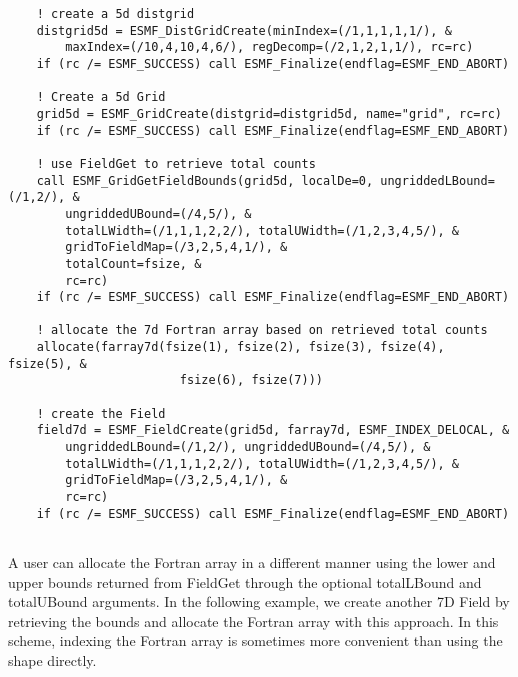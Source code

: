  \begin{verbatim}
    ! create a 5d distgrid
    distgrid5d = ESMF_DistGridCreate(minIndex=(/1,1,1,1,1/), &
        maxIndex=(/10,4,10,4,6/), regDecomp=(/2,1,2,1,1/), rc=rc)
    if (rc /= ESMF_SUCCESS) call ESMF_Finalize(endflag=ESMF_END_ABORT)

    ! Create a 5d Grid
    grid5d = ESMF_GridCreate(distgrid=distgrid5d, name="grid", rc=rc)
    if (rc /= ESMF_SUCCESS) call ESMF_Finalize(endflag=ESMF_END_ABORT)

    ! use FieldGet to retrieve total counts
    call ESMF_GridGetFieldBounds(grid5d, localDe=0, ungriddedLBound=(/1,2/), &
        ungriddedUBound=(/4,5/), &
        totalLWidth=(/1,1,1,2,2/), totalUWidth=(/1,2,3,4,5/), &
        gridToFieldMap=(/3,2,5,4,1/), &
        totalCount=fsize, &
        rc=rc)
    if (rc /= ESMF_SUCCESS) call ESMF_Finalize(endflag=ESMF_END_ABORT)

    ! allocate the 7d Fortran array based on retrieved total counts
    allocate(farray7d(fsize(1), fsize(2), fsize(3), fsize(4), fsize(5), &
                        fsize(6), fsize(7)))

    ! create the Field
    field7d = ESMF_FieldCreate(grid5d, farray7d, ESMF_INDEX_DELOCAL, &
        ungriddedLBound=(/1,2/), ungriddedUBound=(/4,5/), &
        totalLWidth=(/1,1,1,2,2/), totalUWidth=(/1,2,3,4,5/), &
        gridToFieldMap=(/3,2,5,4,1/), &
        rc=rc)
    if (rc /= ESMF_SUCCESS) call ESMF_Finalize(endflag=ESMF_END_ABORT)
 
\end{verbatim}
 

    A user can allocate the Fortran array in a different manner using the lower and
    upper bounds returned from FieldGet through the optional totalLBound and totalUBound
    arguments. In the following example, we create another 7D Field by retrieving the bounds
    and allocate the Fortran array with this approach. In this scheme, indexing the
    Fortran array is sometimes more convenient than using the shape directly. 

